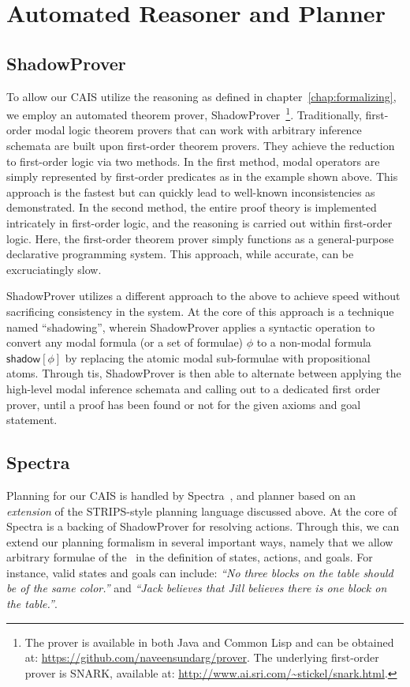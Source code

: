 \section{Automated Reasoner and Planner}\label{sec:automated_reasoner_planner}

\subsection{ShadowProver}

To allow our CAIS utilize the reasoning as defined in 
chapter~\ref{chap:formalizing}, we employ an automated theorem prover,
\textsf{ShadowProver}~\cite{govindarajulu_shadowprover_2018}\footnote{The
  prover is available in both Java and Common Lisp and can be obtained
  at: \url{https://github.com/naveensundarg/prover}. The underlying
  first-order prover is SNARK, available at:
  \url{http://www.ai.sri.com/~stickel/snark.html}.}. Traditionally,
first-order modal logic theorem provers
that can work with arbitrary inference schemata are built upon first-order
theorem provers. They achieve the reduction to first-order logic via two
methods. In the first method, modal operators are simply represented by
first-order predicates as in the example shown above. This approach is the
fastest but can quickly lead to well-known inconsistencies as demonstrated.
In the second method, the entire proof theory is implemented intricately in 
first-order logic, and the reasoning is carried out within first-order
logic. Here, the first-order theorem prover simply functions as a
general-purpose declarative programming system. This approach, while
accurate, can be excruciatingly slow.

\textsf{ShadowProver} utilizes a different approach to the above to achieve
speed without sacrificing consistency in the system. At the core of this
approach is a technique named ``shadowing'', wherein ShadowProver applies a
syntactic operation to convert any modal formula (or a set of formulae) $\phi$
to a non-modal formula $\mathsf{shadow}[\phi]$ by replacing the atomic modal
sub-formulae with propositional atoms. Through tis, ShadowProver is then able
to alternate between applying the high-level modal inference schemata and calling
out to a dedicated first order prover, until a proof has been found or not for the
given axioms and goal statement.

\subsection{Spectra}

Planning for our CAIS is handled by \textsf{Spectra}~\cite{govindarajulu_spectra_2018},
and planner based on an \emph{extension} of the STRIPS-style planning language discussed
above. At the core of \textsf{Spectra} is a backing of \textsf{ShadowProver} for resolving
actions. Through this, we can extend our planning formalism in several important
ways, namely that we allow arbitrary formulae of the \CEC\ in the definition
of states, actions, and goals. For instance, valid states and goals can
include: \emph{``No three blocks on the table should be of the same
color.''}  and \emph{``Jack believes that Jill believes there is one block on
the table.''}.
